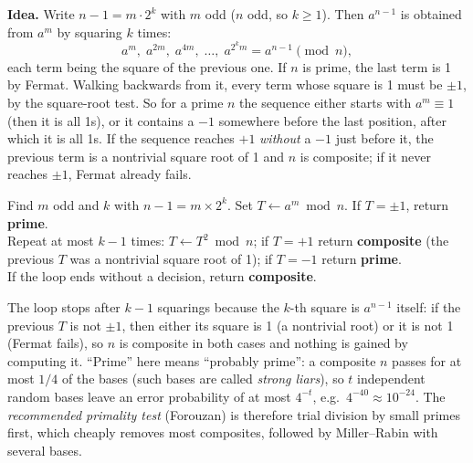 \textbf{Idea.} Write $n - 1 = m \cdot 2^k$ with $m$ odd ($n$ odd, so $k \ge 1$). Then $a^{n-1}$ is obtained from $a^m$ by squaring $k$ times:
\[
a^m,\; a^{2m},\; a^{4m},\; \dots,\; a^{2^k m} = a^{n-1} \pmod n,
\]
each term being the square of the previous one. If $n$ is prime, the last term is 1 by Fermat. Walking backwards from it, every term whose square is 1 must be $\pm1$, by the square-root test. So for a prime $n$ the sequence either starts with $a^m \equiv 1$ (then it is all 1s), or it contains a $-1$ somewhere before the last position, after which it is all 1s. If the sequence reaches $+1$ \emph{without} a $-1$ just before it, the previous term is a nontrivial square root of 1 and $n$ is composite; if it never reaches $\pm1$, Fermat already fails.

\begin{mustknow}
Find $m$ odd and $k$ with $n - 1 = m \times 2^k$. Set $T \leftarrow a^m \bmod n$. If $T = \pm1$, return \textbf{prime}.\\
Repeat at most $k - 1$ times: $T \leftarrow T^2 \bmod n$; if $T = +1$ return \textbf{composite} (the previous $T$ was a nontrivial square root of 1); if $T = -1$ return \textbf{prime}.\\
If the loop ends without a decision, return \textbf{composite}.
\end{mustknow}
The loop stops after $k - 1$ squarings because the $k$-th square is $a^{n-1}$ itself: if the previous $T$ is not $\pm1$, then either its square is 1 (a nontrivial root) or it is not 1 (Fermat fails), so $n$ is composite in both cases and nothing is gained by computing it. ``Prime'' here means ``probably prime'': a composite $n$ passes for at most $1/4$ of the bases (such bases are called \emph{strong liars}), so $t$ independent random bases leave an error probability of at most $4^{-t}$, e.g.\ $4^{-40} \approx 10^{-24}$. The \emph{recommended primality test} (Forouzan) is therefore trial division by small primes first, which cheaply removes most composites, followed by Miller--Rabin with several bases.


